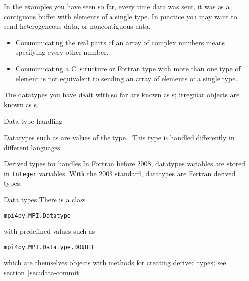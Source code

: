 

In the examples you have seen so far, every time data was sent,
it was as a contiguous buffer with elements of a single type.
In practice you may want to send heterogeneous data, or
noncontiguous data.
\begin{itemize}
\item Communicating the real parts of an array of complex numbers
  means specifying every other number.
\item Communicating a C~structure or Fortran type with more than one
  type of element is not equivalent to sending an array of elements of
  a single type.
\end{itemize}
The datatypes you have dealt with so far are known as
s; irregular objects
are known as s.

 {Data type handling}
\label{sec:mpi-datatype}

Datatypes such as  are values
of the type .
This type is handled differently in different languages.

\begin{fortrannote}{Derived types for handles}
  In Fortran before 2008, datatypes variables are stored in
  \lstinline{Integer} variables.
  With the 2008 standard, datatypes are Fortran derived types:
\end{fortrannote}

\begin{pythonnote}{Data types}
  There is a class
\begin{lstlisting}
mpi4py.MPI.Datatype
\end{lstlisting}
  with predefined values such as 
\begin{lstlisting}
mpi4py.MPI.Datatype.DOUBLE
\end{lstlisting}
  which are themselves objects with methods
  for creating derived types;
  see section~\ref{sec:data-commit}.
\end{pythonnote}

